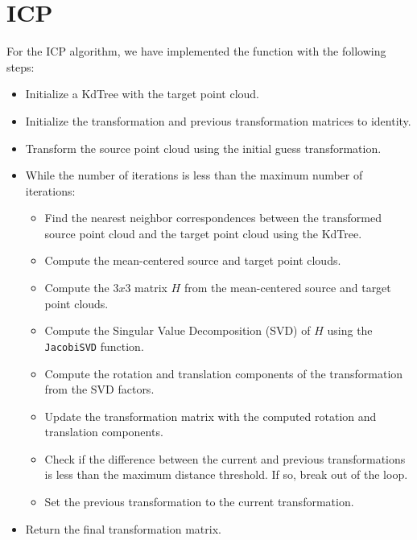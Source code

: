 \section{ICP}
For the ICP algorithm, we have implemented the function with the following steps:
\begin{itemize}
    \item Initialize a KdTree with the target point cloud.
    \item Initialize the transformation and previous transformation matrices to identity.
    \item Transform the source point cloud using the initial guess transformation.
    \item While the number of iterations is less than the maximum number of iterations: 
    \begin{itemize}
        \item Find the nearest neighbor correspondences between the transformed source point cloud and the target point cloud using the KdTree. 
        \item Compute the mean-centered source and target point clouds. 
        \item Compute the $3x3$ matrix $H$ from the mean-centered source and target point clouds. 
        \item Compute the Singular Value Decomposition (SVD) of $H$ using the \texttt{JacobiSVD} function. 
        \item Compute the rotation and translation components of the transformation from the SVD factors. 
        \item Update the transformation matrix with the computed rotation and translation components. 
        \item Check if the difference between the current and previous transformations is less than the maximum distance threshold. If so, break out of the loop. 
        \item Set the previous transformation to the current transformation.
    \end{itemize}
    \item Return the final transformation matrix.
\end{itemize}